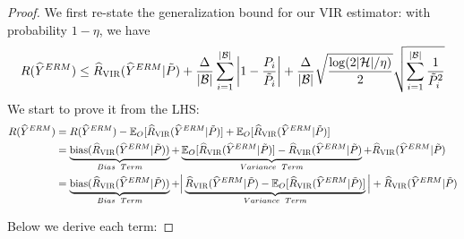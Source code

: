 \begin{proof}
We first re-state the generalization bound for our VIR estimator: with probability $1 - \eta$, we have
%
\begin{align*}
    R (\hat{Y}^{ERM}) \leq \hat{R}_{\textsc{VIR}}(\hat{Y}^{ERM} | \Tilde{P}) + \dfrac{\Delta}{|\mathcal{B}|} \sum_{i=1}^{|\mathcal{B}|} \bigg| 1 - \dfrac{P_{i}}{\Tilde{P}_{i}} \bigg| + \dfrac{\Delta}{|\mathcal{B}|} \sqrt{\dfrac{\log (2 |\mathcal{H}| / \eta)}{2}} \sqrt{\sum_{i=1}^{|\mathcal{B}|} \dfrac{1}{\Tilde{P}_{i}^{2}}}
\end{align*}
%
We start to prove it from the LHS:
\begingroup\makeatletter\def\f@size{9.5}\check@mathfonts
\def\maketag@@@#1{\hbox{\m@th\normalsize\normalfont#1}}%
\begin{align*}
    R (\hat{Y}^{ERM}) &= R (\hat{Y}^{ERM}) - \mathbb{E}_{O} [\hat{R}_{\textsc{VIR}} (\hat{Y}^{ERM} | \Tilde{P})] + \mathbb{E}_{O} [\hat{R}_{\textsc{VIR}} (\hat{Y}^{ERM} | \Tilde{P})] \\
    &= \underbrace{\textrm{bias} (\hat{R}_{\textsc{VIR}} (\hat{Y}^{ERM} | \Tilde{P}))}_{Bias \enspace Term} + \underbrace{\mathbb{E}_{O} [\hat{R}_{\textsc{VIR}} (\hat{Y}^{ERM} | \Tilde{P})] - \hat{R}_{\textsc{VIR}} (\hat{Y}^{ERM} | \Tilde{P})}_{Variance \enspace Term} 
    + \hat{R}_{\textsc{VIR}} (\hat{Y}^{ERM} | \Tilde{P}) \\
    &= \underbrace{\textrm{bias} (\hat{R}_{\textsc{VIR}} (\hat{Y}^{ERM} | \Tilde{P}))}_{Bias \enspace Term} + \Big| \underbrace{\hat{R}_{\textsc{VIR}} (\hat{Y}^{ERM} | \Tilde{P}) - \mathbb{E}_{O} [\hat{R}_{\textsc{VIR}} (\hat{Y}^{ERM} | \Tilde{P})]}_{Variance \enspace Term} \Big|  
    + \hat{R}_{\textsc{VIR}} (\hat{Y}^{ERM} | \Tilde{P})
\end{align*}
\endgroup
%

Below we derive each term:


\end{proof}
